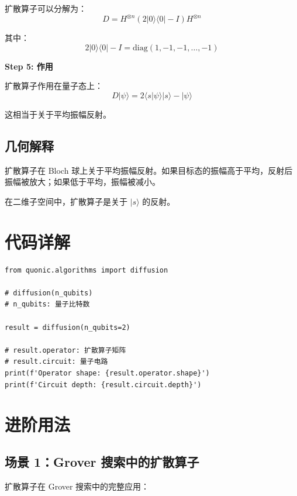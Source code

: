 \documentclass[12pt,a4paper]{article}
\begin{document}
扩散算子可以分解为：
\begin{equation}
D = H^{\otimes n} (2|0\rangle\langle 0| - I) H^{\otimes n}
\end{equation}

其中：
\begin{equation}
2|0\rangle\langle 0| - I = \text{diag}(1, -1, -1, \ldots, -1)
\end{equation}

\textbf{Step 5: 作用}

扩散算子作用在量子态上：
\begin{equation}
D|\psi\rangle = 2\langle s|\psi\rangle|s\rangle - |\psi\rangle
\end{equation}

这相当于关于平均振幅反射。

\subsection{几何解释}

扩散算子在 Bloch 球上关于平均振幅反射。如果目标态的振幅高于平均，反射后振幅被放大；如果低于平均，振幅被减小。

在二维子空间中，扩散算子是关于 $|s\rangle$ 的反射。

\section{代码详解}

\begin{verbatim}
from quonic.algorithms import diffusion

# diffusion(n_qubits)
# n_qubits: 量子比特数

result = diffusion(n_qubits=2)

# result.operator: 扩散算子矩阵
# result.circuit: 量子电路
print(f'Operator shape: {result.operator.shape}')
print(f'Circuit depth: {result.circuit.depth}')
\end{verbatim}

\section{进阶用法}

\subsection{场景 1：Grover 搜索中的扩散算子}

扩散算子在 Grover 搜索中的完整应用：
\end{document}
